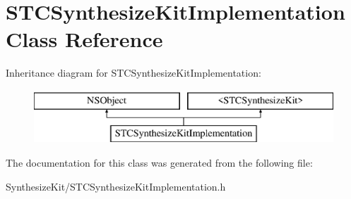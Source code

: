 \hypertarget{interface_s_t_c_synthesize_kit_implementation}{}\section{S\+T\+C\+Synthesize\+Kit\+Implementation Class Reference}
\label{interface_s_t_c_synthesize_kit_implementation}
Inheritance diagram for S\+T\+C\+Synthesize\+Kit\+Implementation\+:\begin{figure}[H]
\begin{center}
\leavevmode
\includegraphics[height=2.000000cm]{interface_s_t_c_synthesize_kit_implementation}
\end{center}
\end{figure}


The documentation for this class was generated from the following file\+:\begin{DoxyCompactItemize}
\item 
Synthesize\+Kit/S\+T\+C\+Synthesize\+Kit\+Implementation.\+h\end{DoxyCompactItemize}
